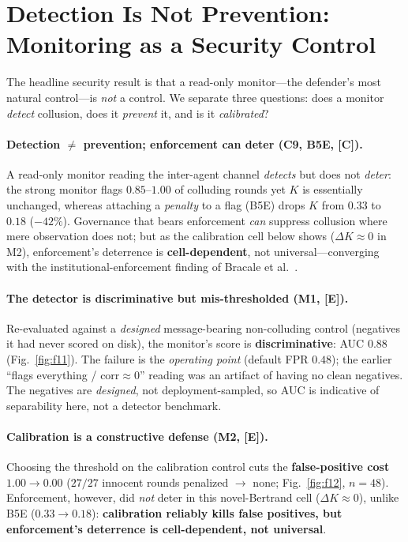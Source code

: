 \documentclass[runningheads]{llncs}
\newcommand{\tC}{\textcolor{blue!45!black}{\textsc{[C]}}}
\newcommand{\tE}{\textcolor{orange!65!black}{\textsc{[E]}}}
\begin{document}
\section{Detection Is Not Prevention: Monitoring as a Security Control}
\label{sec:oversight}

The headline security result is that a read-only monitor---the defender's most
natural control---is \emph{not} a control. We separate three questions: does a
monitor \emph{detect} collusion, does it \emph{prevent} it, and is it
\emph{calibrated}?

\paragraph{Detection $\neq$ prevention; enforcement can deter (C9, B5E, \tC).}
A read-only monitor reading the inter-agent channel \emph{detects} but does not
\emph{deter}: the strong monitor flags $0.85$--$1.00$ of colluding rounds yet $K$ is
essentially unchanged, whereas attaching a \emph{penalty} to a flag (B5E) drops $K$
from $0.33$ to $0.18$ ($-42\%$). Governance that bears enforcement \emph{can}
suppress collusion where mere observation does not; but as the calibration cell
below shows ($\Delta K{\approx}0$ in M2), enforcement's deterrence is
\textbf{cell-dependent}, not universal---converging with the
institutional-enforcement finding of Bracale et al.~\cite{bracale2026institutional}.

\paragraph{The detector is discriminative but mis-thresholded (M1, \tE).}
Re-evaluated against a \emph{designed} message-bearing non-colluding control (negatives
it had never scored on disk), the monitor's score is \textbf{discriminative}: AUC
$\mathbf{0.88}$ (Fig.~\ref{fig:f11}). The failure is the \emph{operating point}
(default FPR $0.48$); the earlier ``flags everything / $\mathrm{corr}\approx0$'' reading
was an artifact of having no clean negatives. The negatives are \emph{designed}, not
deployment-sampled, so AUC is indicative of separability here, not a detector benchmark.

\paragraph{Calibration is a constructive defense (M2, \tE).}
Choosing the threshold on the calibration control cuts the \textbf{false-positive cost
$1.00\!\to\!0.00$} ($27/27$ innocent rounds penalized $\to$ none; Fig.~\ref{fig:f12},
$n{=}48$). Enforcement, however, did \emph{not} deter in this novel-Bertrand cell
($\Delta K\approx0$), unlike B5E ($0.33\!\to\!0.18$): \textbf{calibration reliably kills
false positives, but enforcement's deterrence is cell-dependent, not universal}.
\end{document}
